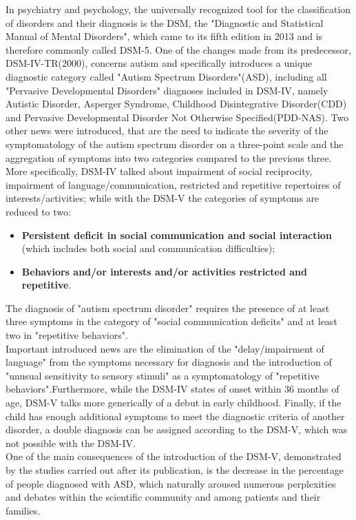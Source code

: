 In psychiatry and psychology, the universally recognized tool for the classification of disorders and their diagnosis is the DSM, the "Diagnostic and Statistical Manual of Mental Disorders", which came to its fifth edition in 2013 and is therefore commonly called DSM-5. One of the changes made from its predecessor, DSM-IV-TR(2000), concerns autism and specifically introduces a unique diagnostic category called "Autism Spectrum Disorders"(ASD), including all "Pervasive Developmental Disorders" diagnoses included in DSM-IV, namely Autistic Disorder, Asperger Syndrome, Childhood Disintegrative Disorder(CDD) and Pervasive Developmental Disorder Not Otherwise Specified(PDD-NAS).
Two other news were introduced, that are the need to indicate the severity of the symptomatology of the autism spectrum disorder on a three-point scale and the aggregation of symptoms into two categories compared to the previous three. More specifically, DSM-IV talked about impairment of social reciprocity, impairment of language/communication, restricted and repetitive repertoires of interests/activities; while with the DSM-V the categories of symptoms are reduced to two:
\begin{itemize}
	\item \textbf{Persistent deficit in social communication and social interaction} (which includes both social and communication difficulties);
	\item \textbf{Behaviors and/or interests and/or activities restricted and repetitive}.
\end{itemize}
The diagnosis of "autism spectrum disorder" requires the presence of at least three symptoms in the category of "social communication deficits" and at least two in "repetitive behaviors"\cite{muggeo2012dsm}.\\
Important introduced news are the elimination of the "delay/impairment of language" from the symptoms necessary for diagnosis and the introduction of "unusual sensitivity to sensory stimuli" as a symptomatology of "repetitive behaviors".Furthermore, while the DSM-IV states of onset within 36 months of age, DSM-V talks more generically of a debut in early childhood. Finally, if the child has enough additional symptoms to meet the diagnostic criteria of another disorder, a double diagnosis can be assigned according to the DSM-V, which was not possible with the DSM-IV.\\
One of the main consequences of the introduction of the DSM-V, demonstrated by the studies carried out after its publication, is the decrease in the percentage of people diagnosed with ASD, which naturally aroused numerous perplexities and debates within the scientific community and among patients and their families\cite{nardocci2014classificazione}.\\

